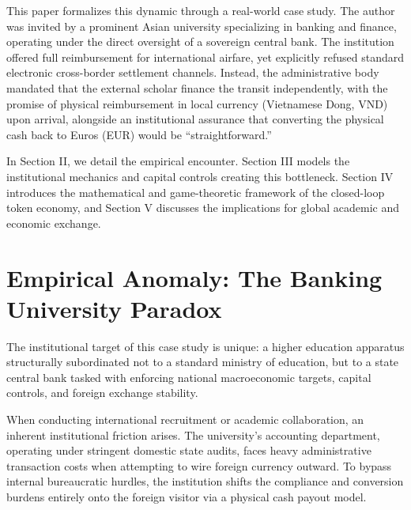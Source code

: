 \documentclass[reprint,amsmath,amssymb,aps,prd,showkeys]{revtex4-2}
\begin{document}
This paper formalizes this dynamic through a real-world case study. The author was invited by a prominent Asian university specializing in banking and finance, operating under the direct oversight of a sovereign central bank. The institution offered full reimbursement for international airfare, yet explicitly refused standard electronic cross-border settlement channels. Instead, the administrative body mandated that the external scholar finance the transit independently, with the promise of physical reimbursement in local currency (Vietnamese Dong, VND) upon arrival, alongside an institutional assurance that converting the physical cash back to Euros (EUR) would be ``straightforward.''

In Section II, we detail the empirical encounter. Section III models the institutional mechanics and capital controls creating this bottleneck. Section IV introduces the mathematical and game-theoretic framework of the closed-loop token economy, and Section V discusses the implications for global academic and economic exchange.

\section{Empirical Anomaly: The Banking University Paradox}
The institutional target of this case study is unique: a higher education apparatus structurally subordinated not to a standard ministry of education, but to a state central bank tasked with enforcing national macroeconomic targets, capital controls, and foreign exchange stability. 

When conducting international recruitment or academic collaboration, an inherent institutional friction arises. The university's accounting department, operating under stringent domestic state audits, faces heavy administrative transaction costs when attempting to wire foreign currency outward. To bypass internal bureaucratic hurdles, the institution shifts the compliance and conversion burdens entirely onto the foreign visitor via a physical cash payout model. 
\end{document}
